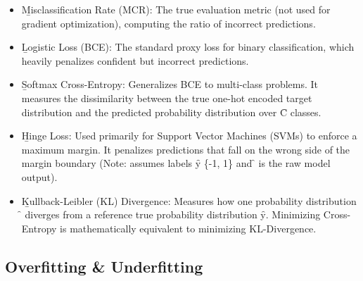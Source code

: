 \begin{itemize}
\item \b{Misclassification Rate (MCR)}: The true evaluation metric (not used for gradient optimization), computing the ratio of incorrect predictions.
\item \b{Logistic Loss (BCE)}: The standard proxy loss for binary classification, which heavily penalizes confident but incorrect predictions.
\item \b{Softmax Cross-Entropy}: Generalizes BCE to multi-class problems. It measures the dissimilarity between the true one-hot encoded target distribution and the predicted probability distribution over \f{C} classes.
\item \b{Hinge Loss}: Used primarily for Support Vector Machines (SVMs) to enforce a maximum margin. It penalizes predictions that fall on the wrong side of the margin boundary (Note: assumes labels \f{y \in \{-1, 1\}} and \f{} is the raw model output).
\item \b{Kullback-Leibler (KL) Divergence}: Measures how one probability distribution \f{} diverges from a reference true probability distribution \f{y}. Minimizing Cross-Entropy is mathematically equivalent to minimizing KL-Divergence.
\end{itemize}




\subsection{Overfitting \& Underfitting}


